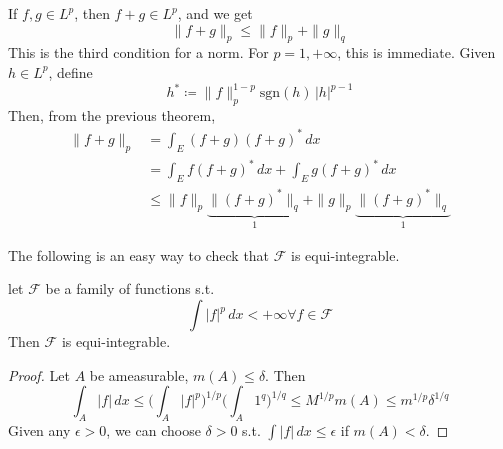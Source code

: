   \begin{theorem}[Minkowski]
    \label{thm:minkowski}
    If $f, g \in L^p$, then $f + g \in L^p$, and we get 
    \begin{equation}
      \| f + g \|_p \leq \|f\|_p + \|g\|_q
    \end{equation}
    This is the third condition for a norm. For $p = 1, +\infty$, this is immediate. Given $h \in L^p$, define 
    \begin{equation}
      h^\ast \coloneqq \|f\|_p^{1-p} \mathrm{sgn}(h) \, |h|^{p-1} 
    \end{equation}
    Then, from the previous theorem, 
    \begin{align}
      \| f + g \|_p & = \int_E (f + g)(f + g)^\ast \,dx  \\ 
                    & = \int_E f (f + g)^\ast \,dx + \int_E g (f + g)^\ast \,dx  \\ 
                    & \leq \|f\|_p \underbrace{\|(f + g)^\ast\|_q}_{1} + \|g\|_p \underbrace{\|(f + g)^\ast\|_q}_{1} 
    \end{align}
  \end{theorem}

  The following is an easy way to check that $\mathscr{F}$ is equi-integrable. 

  \begin{corollary}
    \label{thm:equi-integrability-of-a-bounded-family}
    let $\mathscr{F}$ be a family of functions s.t. 
    \begin{equation}
      \int |f|^p \,dx < +\infty \forall f \in \mathscr{F}
    \end{equation}
    Then $\mathscr{F}$ is equi-integrable. 
  \end{corollary}
  \begin{proof}
    Let $A$ be ameasurable, $m(A) \leq \delta$. Then 
    \begin{equation}
      \int_A |f| \,dx \leq \bigg( \int_A |f|^p \bigg)^{1/p} \bigg( \int_A 1^q \bigg)^{1/q} \leq M^{1/p} m(A) \leq m^{1/p} \delta^{1/q} 
    \end{equation}
    Given any $\epsilon > 0$, we can choose $\delta > 0$ s.t. $\int |f| \,dx \leq \epsilon$ if $m(A) < \delta$. 
  \end{proof}

